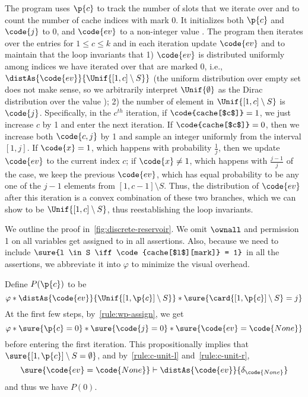 The program uses $\p{c}$ to track the number of
slots that we iterate over and  to count the number of
cache indices with mark 0. It initializes both
$\p{c}$ and $\code{j}$ to 0, and $\code{ev}$ to a non-integer
value .
The program then iterates over the entries  for
$1 \leq c \leq k$ and in each iteration update $\code{ev}$ and 
to maintain that the loop invariants that
1) $\code{ev}$ is distributed uniformly among
indices we have iterated over that are marked 0, i.e.,
$\distAs{\code{ev}}{\Unif{[1,c] \setminus S}}$
(the uniform distribution over empty set does not make sense,
so we arbitrarily interpret $\Unif{\emptyset}$ as the Dirac distribution
over the value );
2) the number of element in $\Unif{[1,c] \setminus S}$ is $\code{j}$.
Specifically, in the $c^{th}$ iteration,
if $\code{cache[$c$]} = 1$, we just increase $c$ by 1 and enter the next iteration.
If $\code{cache[$c$]} = 0$,
then we increase both $\code{c, j}$ by 1
and sample an integer  uniformly from the interval $[1, j]$.
If $\code{x} = 1$, which happens with probability $\frac{1}{j}$,
then we update $\code{ev}$ to the current index $c$;
if $\code{x} \neq 1$, which happens with $\frac{j - 1}{j}$ of the case,
we keep the previous $\code{ev}$, which has equal probability
to be any one of the $j - 1$ elements from $[1,c - 1] \setminus S$.
Thus, the distribution of $\code{ev}$ after this iteration
is a convex combination of these two branches, which we can
show to be $ \Unif{[1,c] \setminus S}$, thus reestablishing the loop invariants.


We outline the proof in~\ref{fig:discrete-reservoir}.
We omit $\ownall$ and permission 1 on all variables get assigned to in all assertions.
Also, because we need to include $\sure{l \in S \iff \code{cache[$l$][mark]} = 1}$
in all the assertions,
we abbreviate it into $\varphi$ to minimize the visual overhead.

Define $P(\p{c})$ to be
\[
  \varphi \ast \distAs{\code{ev}}{\Unif{[1, \p{c}] \setminus S}} \ast \sure{\card{[1, \p{c}] \setminus S} = j}
\]
At the first few steps, by~\ref{rule:wp-assign},
we get
\[
  \varphi \ast \sure{\p{c} = 0} \ast \sure{\code{j} = 0} \ast \sure{\code{ev} = \code{None}}
\]
before entering the first iteration.
This propositionally implies that $\sure{[1, \p{c}] \setminus S = \emptyset}$,
and by~\ref{rule:c-unit-l} and~\ref{rule:c-unit-r},
\[
\sure{\code{ev} = \code{None}} \vdash \distAs{\code{ev}}{\delta_{\code{None}}}
\]
and thus we have $P(0)$.


